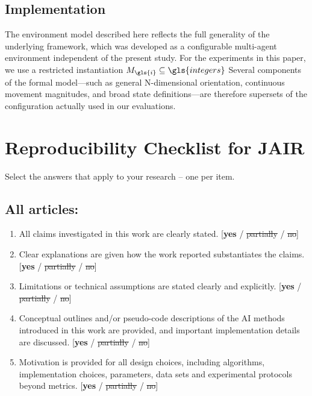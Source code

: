 \documentclass[]{jair}
\renewcommand{\bf}[1]{\textbf{#1}}  %
\begin{document}
\subsection{Implementation}
The environment model described here reflects the full generality of 
the underlying framework, which was developed as a configurable 
multi-agent environment independent of the present study. 
For the experiments in this paper, we use a restricted instantiation 
\(M_{\gls{i}} \subseteq \gls{integers}\) 
Several components of the formal model—such as general N-dimensional orientation, 
continuous movement magnitudes, and broad state definitions—are therefore 
supersets of the configuration actually used in our evaluations.


\clearpage
\section{Reproducibility Checklist for JAIR}

Select the answers that apply to your research -- one per item. 

\subsection*{All articles:}

\begin{enumerate}
    \item All claims investigated in this work are clearly stated. \newline
    [\bf{yes} / \st{partially} / \st{no}]
    \item Clear explanations are given how the work reported substantiates the claims. \newline
    [\bf{yes} / \st{partially} / \st{no}]
    \item Limitations or technical assumptions are stated clearly and explicitly. \newline
    [\bf{yes} / \st{partially} / \st{no}]
    \item Conceptual outlines and/or pseudo-code descriptions of the AI methods introduced 
    in this work are provided, and important implementation details are discussed. \newline
    [\bf{yes} / \st{partially} / \st{no}]
    \item 
    Motivation is provided for all design choices, including algorithms, implementation choices, 
    parameters, data sets and experimental protocols beyond metrics. \newline
    [\bf{yes} / \st{partially} / \st{no}]
\end{enumerate}
\end{document}
